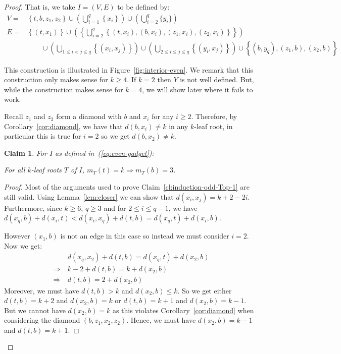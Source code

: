 \documentclass[11pt,letter]{article}
\newtheorem{claim}[theorem]{Claim}
\theoremstyle{remark}
\newcommand{\set}[1]{\left\{#1\right\}}
\begin{document}
\begin{proof}
    That is, we take $I=(V,E)$ to be defined by: 
    \begin{equation}
        \begin{aligned}
            V=&\set{t,b,z_1,z_2} \cup\left(\bigcup_{i=1}^q \set{x_i}\right)\cup\left(\bigcup_{i=2}^{q} \{y_i\}\right)\\
            E=&\set{(t,x_1)}\cup\left(\set{\bigcup_{i=2}^q \set{(t,x_i),(b,x_i),(z_1,x_i),(z_2,x_i)}}\right)\\
            &\qquad \cup \left(\bigcup_{1\leq i<j\leq q}\set{(x_i,x_j)}\right)\cup\left(\bigcup_{2\leq i\leq j\leq q}\set{(y_i,x_j)}\right)\cup\set{(b,y_q),(z_1,b),(z_2,b)}
        \end{aligned}
        \label{eq:even-gadget}
    \end{equation}

This construction is illustrated in Figure~\ref{fig:interior-even}.
    We remark that this construction only makes sense for $k\geq 4$. If $k=2$ then $Y$ is not well defined. But, while the construction makes sense for $k=4$, we will show later where it fails to work.

    Recall $z_1$ and $z_2$ form a diamond with $b$ and $x_i$ for any $i\geq 2$. Therefore, by Corollary~\ref{cor:diamond}, we have that $d(b,x_i)\neq k$ in any $k$-leaf root, in particular this is true for $i=2$ so we get $d(b,x_2)\neq k$.

    
    \begin{claim}\label{cl:induction-even-Top-1}
        For $I$ as defined in~(\ref{eq:even-gadget}):
        
        For all $k$-leaf roots $T$ of $I$, $m_T(t)=k\Longrightarrow m_T(b)=3$.
    \end{claim}

    \begin{proof}    
        Most of the arguments used to prove Claim~\ref{cl:induction-odd-Top-1} are still valid. Using Lemma~\ref{lem:closer} we can show that $d(x_i,x_j)=k+2-2i$. Furthermore, since $k\geq 6$, $q\geq 3$ and for $2\leq i\leq q-1$, we have $d(x_q,b)+d(x_i,t)<d(x_i,x_q)+d(t,b)=d(x_q,t)+d(x_i,b)$. 
        
        However $(x_1,b)$ is not an edge in this case so instead we must consider $i=2$. Now we get:
        \begin{align*}
            &\ d(x_q,x_2)+d(t,b)=d(x_q,t)+d(x_2,b) \\
            \Longrightarrow &\ k-2+d(t,b)=k+d(x_2,b)\\
            \Longrightarrow &\ d(t,b)=2+d(x_2,b)
        \end{align*}
        Moreover, we must have $d(t,b)>k$ and $d(x_2,b)\leq k$. So we get either $d(t,b)=k+2$ and $d(x_2,b)=k$ or $d(t,b)=k+1$ and $d(x_2,b)=k-1$. But we cannot have $d(x_2,b)=k$ as this violates Corollary~\ref{cor:diamond} when considering the diamond $(b,z_1,x_2,z_2)$. Hence, we must have $d(x_2,b)=k-1$ and $d(t,b)=k+1$. 
        

\end{proof}
\end{proof}
\end{document}
